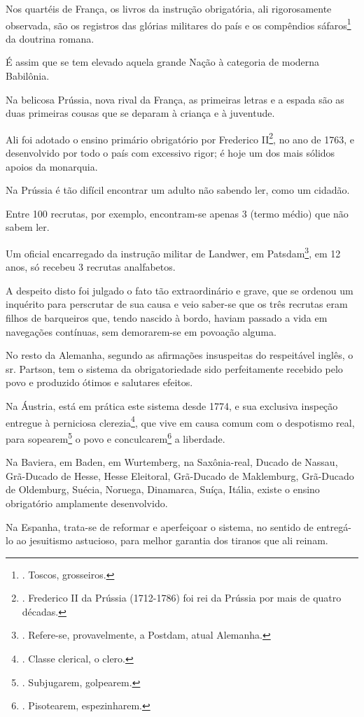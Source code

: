 Nos quartéis de França, os livros da instrução obrigatória, ali
rigorosamente observada, são os registros das glórias militares do país
e os compêndios sáfaros\footnote{. Toscos, grosseiros.} da doutrina
romana.

É assim que se tem elevado aquela grande Nação à categoria de moderna
Babilônia.

Na belicosa Prússia, nova rival da França, as primeiras letras e a
espada são as duas primeiras cousas que se deparam à criança e à
juventude.

Ali foi adotado o ensino primário obrigatório por Frederico
II\footnote{. Frederico II da Prússia (1712-1786) foi rei da Prússia por
  mais de quatro décadas.}, no ano de 1763, e desenvolvido por todo o
país com excessivo rigor; é hoje um dos mais sólidos apoios da
monarquia.

Na Prússia é tão difícil encontrar um adulto não sabendo ler, como um
cidadão.

Entre 100 recrutas, por exemplo, encontram-se apenas 3 (termo médio) que
não sabem ler.

Um oficial encarregado da instrução militar de Landwer, em
Patsdam\footnote{. Refere-se, provavelmente, a Postdam, atual Alemanha.},
em 12 anos, só recebeu 3 recrutas analfabetos.

A despeito disto foi julgado o fato tão extraordinário e grave, que se
ordenou um inquérito para perscrutar de sua causa e veio saber-se que os
três recrutas eram filhos de barqueiros que, tendo nascido à bordo,
haviam passado a vida em navegações contínuas, sem demorarem-se em
povoação alguma.

No resto da Alemanha, segundo as afirmações insuspeitas do respeitável
inglês, o sr. Partson, tem o sistema da obrigatoriedade sido
perfeitamente recebido pelo povo e produzido ótimos e salutares efeitos.

Na Áustria, está em prática este sistema desde 1774, e sua exclusiva
inspeção entregue à perniciosa clerezia\footnote{. Classe clerical, o
  clero.}, que vive em causa comum com o despotismo real, para
sopearem\footnote{. Subjugarem, golpearem.} o povo e
conculcarem\footnote{. Pisotearem, espezinharem.} a liberdade.

Na Baviera, em Baden, em Wurtemberg, na Saxônia-real, Ducado de Nassau,
Grã-Ducado de Hesse, Hesse Eleitoral, Grã-Ducado de Maklemburg,
Grã-Ducado de Oldemburg, Suécia, Noruega, Dinamarca, Suíça, Itália,
existe o ensino obrigatório amplamente desenvolvido.

Na Espanha, trata-se de reformar e aperfeiçoar o sistema, no sentido de
entregá-lo ao jesuitismo astucioso, para melhor garantia dos tiranos que
ali reinam.

